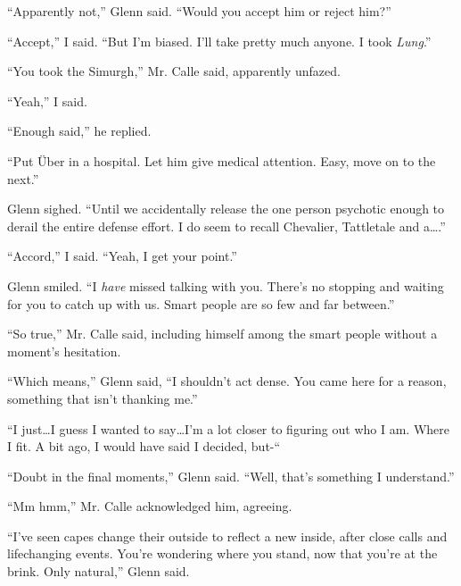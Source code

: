``Apparently not,'' Glenn said.  ``Would you accept him or reject him?''



``Accept,'' I said.  ``But I'm biased.  I'll take pretty much anyone.  I took \emph{Lung}.''



``You took the Simurgh,'' Mr. Calle said, apparently unfazed.



``Yeah,'' I said.



``Enough said,'' he replied.



``Put \"{U}ber in a hospital.  Let him give medical attention.  Easy, move on to the next.''



Glenn sighed.  ``Until we accidentally release the one person psychotic enough to derail the entire defense effort.  I do seem to recall Chevalier, Tattletale and a\ldots.''



``Accord,'' I said.  ``Yeah, I get your point.''



Glenn smiled.  ``I \emph{have} missed talking with you.  There's no stopping and waiting for you to catch up with us.  Smart people are so few and far between.''



``So true,'' Mr. Calle said, including himself among the smart people without a moment's hesitation.



``Which means,'' Glenn said, ``I shouldn't act dense.  You came here for a reason, something that isn't thanking me.''



``I just\ldots I guess I wanted to say\ldots I'm a lot closer to figuring out who I am.  Where I fit.  A bit ago, I would have said I decided, but-``



``Doubt in the final moments,'' Glenn said.  ``Well, that's something I understand.''



``Mm hmm,'' Mr. Calle acknowledged him, agreeing.



``I've seen capes change their outside to reflect a new inside, after close calls and lifechanging events.  You're wondering where you stand, now that you're at the brink.  Only natural,'' Glenn said.



